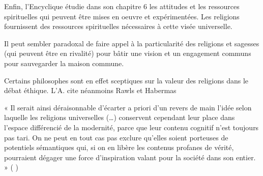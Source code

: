 Enfin, l'Encyclique étudie dans son chapitre 6 les attitudes et les ressources spirituelles qui peuvent être mises en oeuvre et expérimentées. Les religions fournissent des ressources spirituelles nécessaires à cette visée universelle. 

\begin{comment}
    religion universelle ou non ? 
\end{comment}

\begin{singlequote}
Il peut sembler paradoxal de faire appel à la particularité des religions et sagesses (qui peuvent être en rivalité) pour bâtir une vision et un engagement communs pour sauvegarder la maison commune. \cite{thomasset_recherche_2019}
\end{singlequote}
Certains philosophes sont en effet sceptiques sur la valeur des religions dans le débat éthique. L'A. cite néanmoins Rawls et Habermas
\begin{singlequote}
    « Il serait ainsi déraisonnable d’écarter a priori d’un revers de main l’idée selon laquelle les religions universelles (…) conservent cependant leur place dans l’espace différencié de la modernité, parce que leur contenu cognitif n’est toujours pas tari. On ne peut en tout cas pas exclure qu’elles soient porteuses de potentiels sémantiques qui, si on en libère les contenus profanes de vérité, pourraient dégager une force d’inspiration valant pour la société dans son entier. » (	\cite[ p. 204.]{habermas_entre_2008})
\end{singlequote} 

